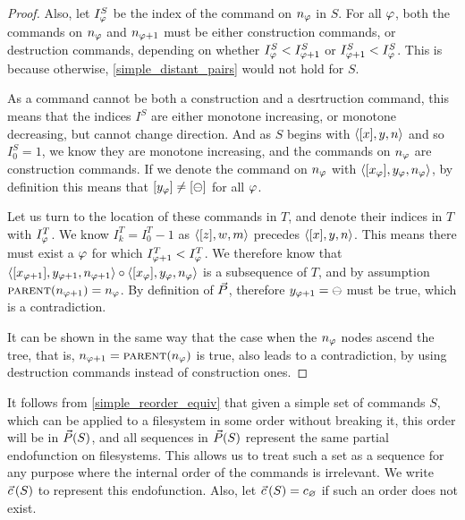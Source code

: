 \begin{proof}
Also, let $I^S_\varphi$ be the index of the command on $n_\varphi$ in $S$.
For all $\varphi$, both the commands on $n_\varphi$ and $n_{\varphi+1}$ must be either
construction commands, or destruction commands, depending on
whether $I^S_\varphi<I^S_{\varphi+1}$ or $I^S_{\varphi+1}<I^S_\varphi$.
This is because otherwise, \cref{simple_distant_pairs} would not hold for $S$.

As a command cannot be both a construction and a desrtruction command,
this means that the indices $I^S$ are either monotone increasing, or monotone
decreasing, but cannot change direction.
And as $S$ begins with $\langle{[x],y,n}\rangle$ and so $I^S_0=1$, we know they are monotone increasing,
and the commands on $n_\varphi$ are construction commands.
If we denote the command on $n_\varphi$ with $\langle{[x_\varphi],y_\varphi,n_\varphi}\rangle$,
by definition this means that $[y_\varphi]\neq[\ominus]$ for all $\varphi$.

Let us turn to the location of these commands in $T$,
and denote their indices in $T$ with $I^T_\varphi$.
We know $I^T_k=I^T_0-1$ as $\langle{[z],w,m}\rangle$ precedes $\langle{[x],y,n}\rangle$.
This means there must exist a $\varphi$ for which $I^T_{\varphi+1}<I^T_\varphi$.
We therefore know that
$\langle{[x_{\varphi+1}],y_{\varphi+1},n_{\varphi+1}}\rangle \circ \langle{[x_\varphi],y_\varphi,n_\varphi}\rangle$
is a subsequence of $T$, and by assumption $\text{\normalfont\scshape{parent}}(n_{\varphi+1})=n_\varphi$.
By definition of $\vec{P}$, therefore $y_{\varphi+1}=\ominus$ must be true,
which is a contradiction.

It can be shown in the same way
that the case when the $n_\varphi$ nodes ascend the tree,
that is, $n_{\varphi+1}=\text{\normalfont\scshape{parent}}(n_\varphi)$ is true, also leads to a contradiction,
by using destruction commands instead of construction ones.
\end{proof}


\begin{mydef}[$\ordsign$]
It follows from \cref{simple_reorder_equiv} that given a simple set of commands $S$,
which can be applied to a filesystem in some order without breaking it,
this order will be in $\vec{P}({S})$,
and all sequences in $\vec{P}({S})$
represent the same partial endofunction on filesystems.
This allows us to treat such a set as a sequence for any purpose
where the internal order of the commands is irrelevant.
We write $\vec{c}\,({S})$ to represent this endofunction.
Also, let $\vec{c}\,({S})=c_\varnothing$ if such an order does not exist.
\end{mydef}
